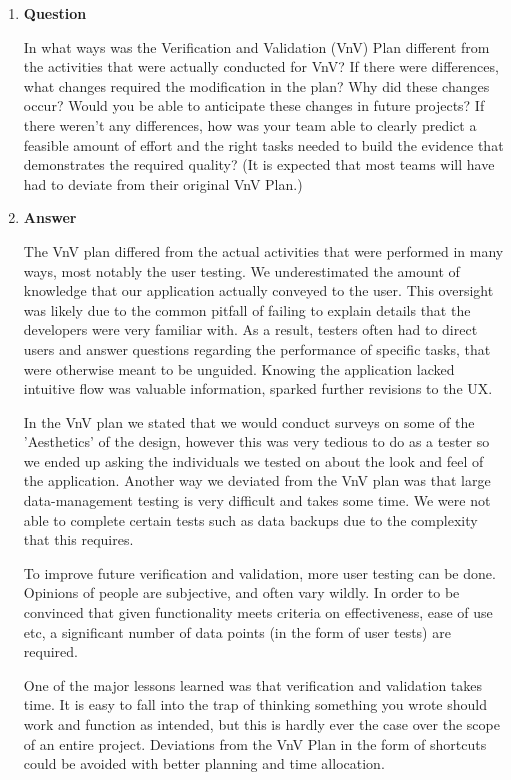 \documentclass[12pt, titlepage]{article}
\begin{document}
\begin{enumerate}
	\item \textbf{Question} 
	
	In what ways was the Verification and Validation (VnV) Plan different
	from the activities that were actually conducted for VnV?  If there were
	differences, what changes required the modification in the plan?  Why did
	these changes occur?  Would you be able to anticipate these changes in future
	projects?  If there weren't any differences, how was your team able to clearly
	predict a feasible amount of effort and the right tasks needed to build the
	evidence that demonstrates the required quality?  (It is expected that most
	teams will have had to deviate from their original VnV Plan.)
	
	\item \textbf{Answer}
	
	The VnV plan differed from the actual activities that were performed in many ways, most notably the user testing. We underestimated the amount of knowledge that our application actually conveyed to the user. This oversight was likely due to the common pitfall of failing to explain details that the developers were very familiar with. As a result, testers often had to direct users and answer questions regarding the performance of specific tasks, that were otherwise meant to be unguided. Knowing the application lacked intuitive flow was valuable information, sparked further revisions to the UX.
	 
	In the VnV plan we stated that we would conduct surveys on some of the 'Aesthetics' of the design, however this was very tedious to do as a tester so we ended up asking the individuals we tested on about the look and feel of the application. Another way we deviated from the VnV plan was that large data-management testing is very difficult and takes some time. We were not able to complete certain tests such as data backups due to the complexity that this requires.
	
	To improve future verification and validation, more user testing can be done. Opinions of people are subjective, and often vary wildly. In order to be convinced that given functionality meets criteria on effectiveness, ease of use etc, a significant number of data points (in the form of user tests) are required.
	
	 One of the major lessons learned was that verification and validation takes time. It is easy to fall into the trap of thinking something you wrote should work and function as intended, but this is hardly ever the case over the scope of an entire project. Deviations from the VnV Plan in the form of shortcuts could be avoided with better planning and time allocation.
	
\end{enumerate}
\end{document}
